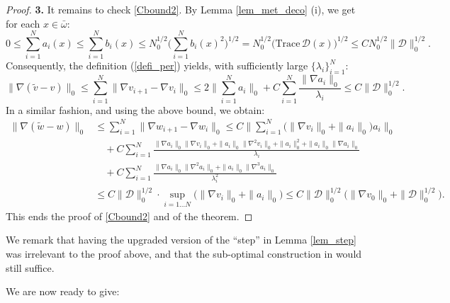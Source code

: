 \documentclass[reqno,twoside,11pt]{amsart}
\numberwithin{equation}{section}
\theoremstyle{plain}
\theoremstyle{definition}
\begin{document}
\begin{proof}
\medskip

{\bf 3.} It remains to check \ref{Cbound2}. By Lemma
\ref{lem_met_deco} (i), we get for each $x\in\bar\omega$:
$$0\leq \sum_{i=1}^Na_i(x) \leq \sum_{i=1}^Nb_i(x) \leq N_0^{1/2}
\big(\sum_{i=1}^Nb_i(x)^2\big)^{1/2}  =   N_0^{1/2}
\big(\mathrm{Trace}\,\mathcal{D}(x)\big)^{1/2}
\leq C N_0^{1/2} \|\mathcal{D}\|_0^{1/2}.$$
Consequently, the definition (\ref{defi_per}) yields, with
sufficiently large $\{\lambda_i\}_{i=1}^N$: 
\begin{equation*}
\|\nabla (\tilde v-v)\|_0\leq \sum_{i=1}^N \|\nabla v_{i+1}-\nabla v_i\|_0 \leq
2 \|\sum_{i=1}^N  a_i\|_0 + C\sum_{i=1}^N \frac{\|\nabla a_i\|_0}{\lambda_i} 
\leq C \|\mathcal{D}\|_0^{1/2}.
\end{equation*}
In a similar fashion, and using the above bound, we obtain:
\begin{equation*}
\begin{split}
\|\nabla (\tilde w-w)\|_0& \leq \sum_{i=1}^N \|\nabla w_{i+1}-\nabla w_i\|_0 \leq
C\Big \|\sum_{i=1}^N  \big(\|\nabla v_i\|_0 +\|a_i\|_0\big) a_i\Big\|_0
\\ & \quad + C\sum_{i=1}^N \frac{\|\nabla a_i\|_0\|\nabla v_i\|_0 +
  \|a_i\|_0\|\nabla^2v_i\|_0 + \|a_i\|_0^2+\|a_i\|_0\|\nabla a_i\|_0}{\lambda_i}  
\\ & \quad + C \sum_{i=1}^N \frac{\|\nabla a_i\|_0\|\nabla^2 a_i\|_0 +
  \|a_i\|_0\|\nabla^3a_i\|_0 }{\lambda_i^2}  \\ & \leq C \|\mathcal{D}\|_0^{1/2}
\cdot \sup_{i=1\ldots N}\big(\|\nabla v_i\|_0+ \|a_i\|_0\big)
\leq C \|\mathcal{D}\|_0^{1/2} \big(\|\nabla v_0\|_0+ \|\mathcal{D}\|_0^{1/2}\big).
\end{split}
\end{equation*}
This ends the proof of \ref{Cbound2} and of the theorem.
\end{proof}

\smallskip

\noindent We remark that having the upgraded version of the ``step''
in Lemma \ref{lem_step} was irrelevant to the proof
above, and that the sub-optimal construction in \cite[Lemma
2.2]{lewpak_MA} would still suffice. 

\bigskip

\noindent We are now ready to give: 

\medskip

\end{document}

